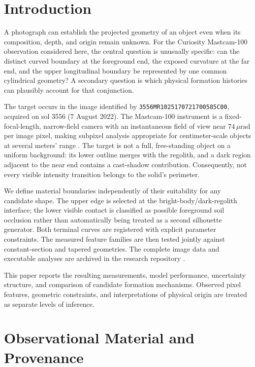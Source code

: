 \documentclass[11pt,letterpaper]{article}
\newcommand{\pdsid}{\texttt{3556MR1025170721700585C00}}
\begin{document}
\section{Introduction}
\label{sec:intro}

A photograph can establish the projected geometry of an object even when its composition, depth, and origin remain unknown. For the Curiosity Mastcam-100 observation considered here, the central question is unusually specific: can the distinct curved boundary at the foreground end, the exposed curvature at the far end, and the upper longitudinal boundary be represented by one common cylindrical geometry? A secondary question is which physical formation histories can plausibly account for that conjunction.

The target occurs in the image identified by \pdsid, acquired on sol 3556 (7 August 2022). The Mastcam-100 instrument is a fixed-focal-length, narrow-field camera with an instantaneous field of view near \(74\,\mu\mathrm{rad}\) per image pixel, making subpixel analysis appropriate for centimeter-scale objects at several meters' range \cite{malin2017,bell2017}. The target is not a full, free-standing object on a uniform background: its lower outline merges with the regolith, and a dark region adjacent to the near end contains a cast-shadow contribution. Consequently, not every visible intensity transition belongs to the solid's perimeter.

We define material boundaries independently of their suitability for any candidate shape. The upper edge is selected at the bright-body/dark-regolith interface; the lower visible contact is classified as possible foreground soil occlusion rather than automatically being treated as a second silhouette generator. Both terminal curves are registered with explicit parameter constraints. The measured feature families are then tested jointly against constant-section and tapered geometries. The complete image data and executable analyses are archived in the research repository \cite{bogner2026repo}.

This paper reports the resulting measurements, model performance, uncertainty structure, and comparison of candidate formation mechanisms. Observed pixel features, geometric constraints, and interpretations of physical origin are treated as separate levels of inference.

\section{Observational Material and Provenance}
\label{sec:data}
\end{document}
